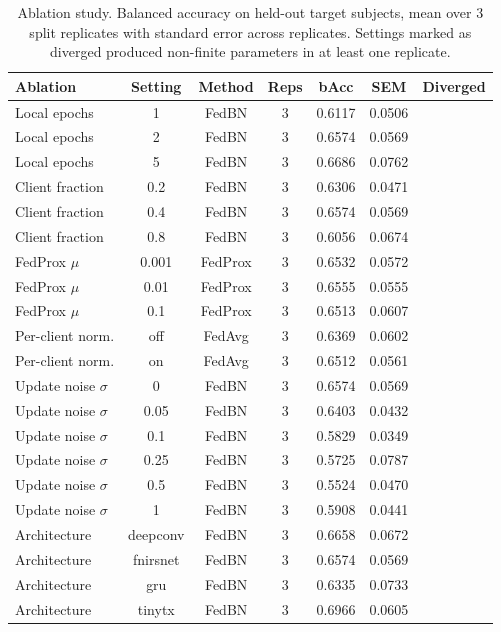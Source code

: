\begin{table}
\caption{Ablation study. Balanced accuracy on held-out target subjects, mean over 3 split replicates with standard error across replicates. Settings marked as diverged produced non-finite parameters in at least one replicate.}
\label{tab:abl}
\begin{tabular}{lcccccc}
\toprule
Ablation & Setting & Method & Reps & bAcc & SEM & Diverged \\
\midrule
Local epochs & 1 & FedBN & 3 & 0.6117 & 0.0506 &  \\
Local epochs & 2 & FedBN & 3 & 0.6574 & 0.0569 &  \\
Local epochs & 5 & FedBN & 3 & 0.6686 & 0.0762 &  \\
Client fraction & 0.2 & FedBN & 3 & 0.6306 & 0.0471 &  \\
Client fraction & 0.4 & FedBN & 3 & 0.6574 & 0.0569 &  \\
Client fraction & 0.8 & FedBN & 3 & 0.6056 & 0.0674 &  \\
FedProx $\mu$ & 0.001 & FedProx & 3 & 0.6532 & 0.0572 &  \\
FedProx $\mu$ & 0.01 & FedProx & 3 & 0.6555 & 0.0555 &  \\
FedProx $\mu$ & 0.1 & FedProx & 3 & 0.6513 & 0.0607 &  \\
Per-client norm. & off & FedAvg & 3 & 0.6369 & 0.0602 &  \\
Per-client norm. & on & FedAvg & 3 & 0.6512 & 0.0561 &  \\
Update noise $\sigma$ & 0 & FedBN & 3 & 0.6574 & 0.0569 &  \\
Update noise $\sigma$ & 0.05 & FedBN & 3 & 0.6403 & 0.0432 &  \\
Update noise $\sigma$ & 0.1 & FedBN & 3 & 0.5829 & 0.0349 &  \\
Update noise $\sigma$ & 0.25 & FedBN & 3 & 0.5725 & 0.0787 &  \\
Update noise $\sigma$ & 0.5 & FedBN & 3 & 0.5524 & 0.0470 &  \\
Update noise $\sigma$ & 1 & FedBN & 3 & 0.5908 & 0.0441 &  \\
Architecture & deepconv & FedBN & 3 & 0.6658 & 0.0672 &  \\
Architecture & fnirsnet & FedBN & 3 & 0.6574 & 0.0569 &  \\
Architecture & gru & FedBN & 3 & 0.6335 & 0.0733 &  \\
Architecture & tinytx & FedBN & 3 & 0.6966 & 0.0605 &  \\
\bottomrule
\end{tabular}
\end{table}
